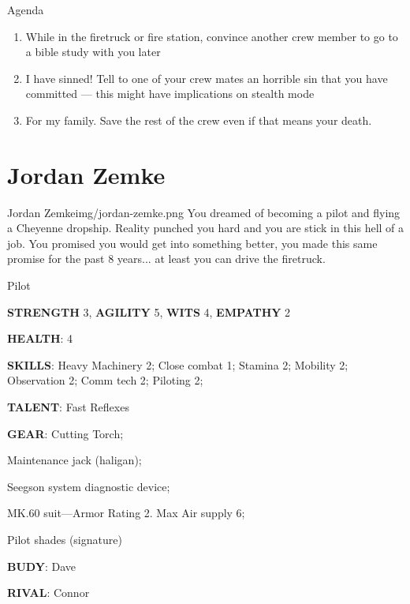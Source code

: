 \begin{rpg-commentbox}{Agenda}
    \begin{enumerate}[label=\textbf{Act \arabic*}, leftmargin=1cm]
        \item While in the firetruck or fire station, convince another crew member to go to a bible study with you later
        \item I have sinned! Tell to one of your crew mates an horrible sin that you have committed --- this might have implications on stealth mode
        \item For my family. Save the rest of the crew even if that means your death. 
    \end{enumerate}
\end{rpg-commentbox}


\newsect

\clearpage

\section{Jordan Zemke}


\begin{rpg-pcbox}{Jordan Zemke}{img/jordan-zemke.png}
    You dreamed of becoming a pilot and flying a Cheyenne dropship. Reality punched you hard and you are stick in this hell of a job. You promised you would get into something better, you made this same promise  for the past 8 years... at least you can drive the firetruck.
\end{rpg-pcbox}

\begin{rpg-commentbox}{}
    Pilot

    \textbf{STRENGTH} 3, \textbf{AGILITY} 5, \textbf{WITS} 4, \textbf{EMPATHY} 2

    \textbf{HEALTH}: 4

    \textbf{SKILLS}: Heavy Machinery 2; Close combat 1; Stamina 2; Mobility 2; Observation 2; Comm tech 2; Piloting 2;

    \textbf{TALENT}: Fast Reflexes
    
    \textbf{GEAR}: Cutting Torch;
    
    Maintenance jack (haligan);
    
    Seegson system diagnostic device;
    
    MK.60 suit---Armor Rating 2. Max Air supply 6;  
    
    Pilot shades (signature)

    \textbf{BUDY}: Dave
    
    \textbf{RIVAL}: Connor
\end{rpg-commentbox}


